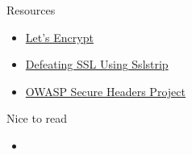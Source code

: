 \documentclass{curs}
\begin{document}
\begin{frame}{Resources}
  \begin{itemize}
    \item \href{https://letsencrypt.org/}{Let's Encrypt}
    \item \href{https://www.youtube.com/watch?v=MFol6IMbZ7Y}{Defeating SSL Using Sslstrip}
    \item \href{https://www.owasp.org/index.php/OWASP_Secure_Headers_Project}{OWASP Secure Headers Project}
  \end{itemize}
\end{frame}

\begin{frame}{Nice to read}
  \begin{itemize}
    \item 
  \end{itemize}
\end{frame}
\end{document}
